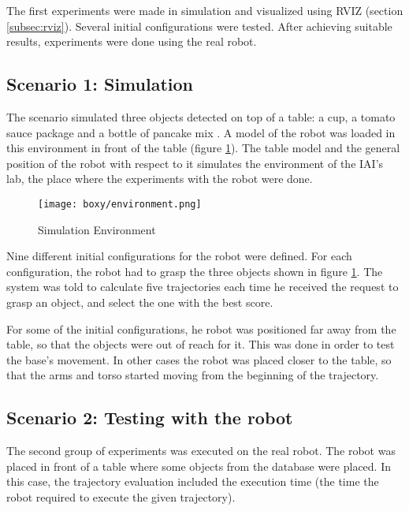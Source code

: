 The first experiments were made in simulation and visualized using RVIZ (section \ref{subsec:rviz}). Several initial configurations were tested. After achieving suitable results, experiments were done using the real robot.


\subsection{Scenario 1: Simulation}
\label{sub:scenario1}

The scenario simulated three objects detected on top of a table: a cup, a tomato sauce package and a bottle of pancake mix . A model of the robot was loaded in this environment in front of the table (figure \ref{fig:env}). The table model and the general position of the robot with respect to it simulates the environment of the IAI's lab, the place where the experiments with the robot were done.

\begin{figure}[H]
	\centering
	{\texttt{[image: boxy/environment.png]}}
	\vspace{-12pt}
	\caption[Simulation Environment]{Simulation Environment}
	\vspace{-15pt}
	\label{fig:env}
\end{figure}

Nine different initial configurations for the robot were defined. For each configuration, the robot had to grasp the three objects shown in figure \ref{fig:env}. The system was told to calculate five trajectories each time he received the request to grasp an object, and select the one with the best score.

For some of the initial configurations, he robot was positioned far away from the table, so that the objects were out of reach for it. This was done in order to test the base's movement. In other cases the robot was placed closer to the table, so that the arms and torso started moving from the beginning of the trajectory.


\subsection{Scenario 2: Testing with the robot}

The second group of experiments was executed on the real robot. The robot was placed in front of a table where some objects from the database were placed. In this case, the trajectory evaluation included the execution time (the time the robot required to execute the given trajectory).

